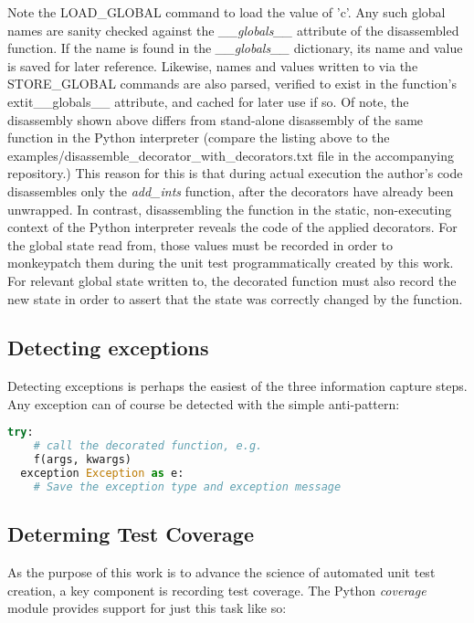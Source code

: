 

Note the LOAD\_GLOBAL command to load the value of 'c'.  Any such global names 
are sanity checked against the \textit{\_\_globals\_\_} attribute of the disassembled function.
%
If the name is found in the \textit{\_\_globals\_\_} dictionary, its name and value is saved for later reference.  Likewise, names and values written to via the STORE\_GLOBAL commands are also parsed, verified to exist in the function's extit{\_\_globals\_\_} attribute, and cached for later use if so.
%
Of note, the disassembly shown above differs from stand-alone disassembly of the same function in the Python interpreter (compare the listing above to the examples/disassemble\_decorator\_with\_decorators.txt file in the accompanying repository.)
This reason for this is that during actual execution the author's code disassembles only the \textit{add\_ints} function, after the decorators have already been unwrapped.
In contrast, disassembling the function in the static, non-executing context of
the Python interpreter reveals the code of the applied decorators.  
%
For the global state read from, those values must be recorded 
in order to monkeypatch them during the unit test programmatically 
created by this work.
%
For relevant global state written to, the decorated function must also record
the new state in order to assert that the state was correctly changed by the function.

\subsection{Detecting exceptions}\label{sec:approach-internal-3}
Detecting exceptions is perhaps the easiest of the three information capture steps.
Any exception can of course be detected with the simple anti-pattern:

\begin{lstlisting}[language=Python]
  try:
    # call the decorated function, e.g.
    f(args, kwargs)
  exception Exception as e:
    # Save the exception type and exception message
  \end{lstlisting}

\subsection{Determing Test Coverage}\label{sec:approach-internal-4}
As the purpose of this work is to advance the science of automated unit test 
creation, a key component is recording test coverage.  The Python \textit{coverage}
module provides support for just this task like so:

